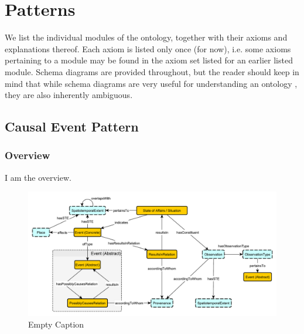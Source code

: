 \chapter{Patterns}
\label{sec:mods}
We list the individual modules of the ontology, together with their axioms and explanations thereof. Each axiom is listed only once (for now), i.e. some axioms pertaining to a module may be found in the axiom set listed for an earlier listed module. Schema diagrams are provided throughout, but the reader should keep in mind that while schema diagrams are very useful for understanding an ontology \cite{odp-documentation}, they are also inherently ambiguous.

\section{Causal Event Pattern}
\label{fig:causal-event-pattern}
\subsection{Overview}
\label{ssec:overview}
I am the overview.

\begin{figure}[h!]
  \begin{center}
    \includegraphics[width=\textwidth]{resources/causal-event-pattern.pdf}
  \end{center}
  \caption{Empty Caption}
  \label{fig:ov}
\end{figure}


